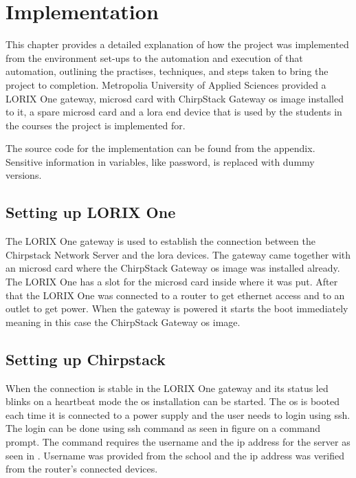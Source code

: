 
\chapter{Implementation} \label{ch:impl}
This chapter provides a detailed explanation of how the project was implemented from the environment set-ups to the automation and execution of that automation, outlining the practises, techniques, and steps taken to bring the project to completion.
Metropolia University of Applied Sciences provided a LORIX One gateway, micro\gls{sd} card with ChirpStack Gateway \gls{os} image installed to it, a spare micro\gls{sd} card and a \gls{lora} end device that is used by the students in the courses the project is implemented for.

The source code for the implementation can be found from the appendix.
Sensitive information in variables, like password, is replaced with dummy versions.

\section{Setting up LORIX One}
The LORIX One gateway is used to establish the connection between the Chirpstack Network Server and the \gls{lora} devices.
The gateway came together with an micro\gls{sd} card where the ChirpStack Gateway \gls{os} image was installed already.
The LORIX One has a slot for the micro\gls{sd} card inside where it was put.
After that the LORIX One was connected to a router to get ethernet access and to an outlet to get power.
When the gateway is powered it starts the boot immediately meaning in this case the ChirpStack Gateway \gls{os} image.

\section{Setting up Chirpstack}
When the connection is stable in the LORIX One gateway and its status led blinks on a heartbeat mode the \gls{os} installation can be started.
The \gls{os} is booted each time it is connected to a power supply and the user needs to login using \gls{ssh}.
The login can be done using ssh command as seen in figure on a command prompt.
The command requires the username and the \gls{ip} address for the server as seen in .
Username was provided from the school and the \gls{ip} address was verified from the router's connected devices.



